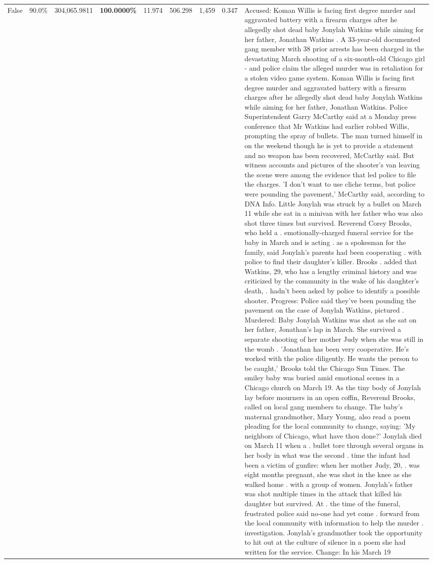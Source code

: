 \begin{table}[H]
\begin{tabular}{lllrlllll}
False & 90.0\% & \color{red} 304,065.9811 & \bfseries \color{red} 100.0000\% & 11.974 & 506.298 & 1,459 & 0.347 & Accused: Koman Willis is facing first degree murder and aggravated battery with a firearm charges after he allegedly shot dead baby Jonylah Watkins while aiming for her father, Jonathan Watkins . A 33-year-old documented gang member with 38 prior arrests has been charged in the devastating March shooting of a six-month-old Chicago girl - and police claim the alleged murder was in retaliation for a stolen video game system. Koman Willis is facing first degree murder and aggravated battery with a firearm charges after he allegedly shot dead baby Jonylah Watkins while aiming for her father, Jonathan Watkins. Police Superintendent Garry McCarthy said at a Monday press conference that Mr Watkins had earlier robbed Willis, prompting the spray of bullets. The man turned himself in on the weekend though he is yet to provide a statement and no weapon has been recovered, McCarthy said. But witness accounts and pictures of the shooter's van leaving the scene were among the evidence that led police to file the charges. 'I don't want to use cliche terms, but police were pounding the pavement,' McCarthy said, according to DNA Info. Little Jonylah was struck by a bullet on March 11 while she sat in a minivan with her father who was also shot three times but survived. Reverend Corey Brooks, who held a . emotionally-charged funeral service for the baby in March and is acting . as a spokesman for the family, said Jonylah's parents had been cooperating . with police to find their daughter's killer. Brooks . added that Watkins, 29, who has a lengthy criminal history and was criticized by the community in the wake of his daughter's death, . hadn't been asked by police to identify a possible shooter. Progress: Police said they've been pounding the pavement on the case of Jonylah Watkins, pictured . Murdered: Baby Jonylah Watkins was shot as she sat on her father, Jonathan's lap in March. She survived a separate shooting of her mother Judy when she was still in the womb . 'Jonathan has been very cooperative. He's worked with the police diligently. He wants the person to be caught,' Brooks told the Chicago Sun Times. The smiley baby was buried amid emotional scenes in a Chicago church on March 19. As the tiny body of Jonylah lay before mourners in an open coffin, Reverend Brooks, called on local gang members to change. The baby's maternal grandmother, Mary Young, also read a poem pleading for the local community to change, saying: 'My neighbors of Chicago, what have thou done?' Jonylah died on March 11 when a . bullet tore through several organs in her body in what was the second . time the infant had been a victim of gunfire: when her mother Judy, 20, . was eight months pregnant, she was shot in the knee as she walked home . with a group of women. Jonylah's father was shot multiple times in the attack that killed his daughter but survived. At . the time of the funeral, frustrated police said no-one had yet come . forward from the local community with information to help the murder . investigation. Jonylah's grandmother took the opportunity to hit out at the culture of silence in a poem she had written for the service. Change: In his March 19 
\end{tabular}
\end{table}
